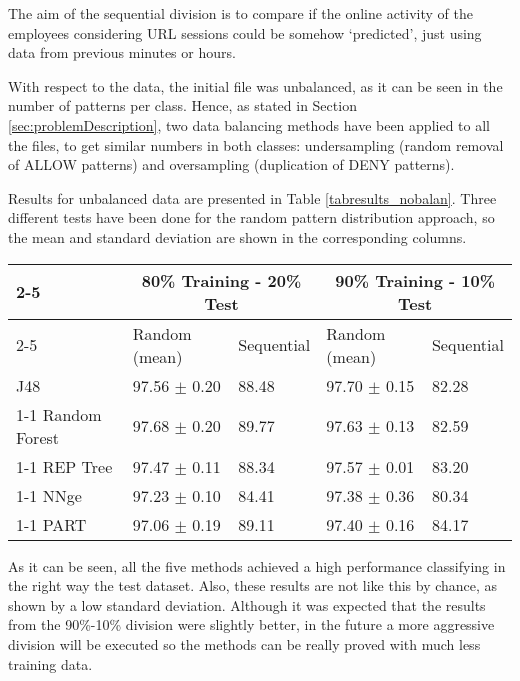 \documentclass{llncs}
\begin{document}
The aim of the sequential division is to compare if the online activity of the employees considering URL sessions could be somehow `predicted', just using data from previous minutes or hours.

With respect to the data, the initial file was unbalanced, as it can be seen in the number of patterns per class. Hence, as stated in Section \ref{sec:problemDescription}, two data balancing methods have been applied to all the files, to get similar numbers in both classes: undersampling (random removal of ALLOW patterns) and oversampling (duplication of DENY patterns).

Results for unbalanced data are presented in Table \ref{tabresults_nobalan}.
Three different tests have been done for the random pattern distribution approach, so the mean and standard deviation are shown in the corresponding columns.

\begin{table*}[htpb]
\centering
 \caption{\label{tabresults_nobalan} Percentage of correctly classified patterns for unbalanced data}
{\small
\begin{tabular}{|l|l|l|l|l|}
\cline{2-5}
\multicolumn{1}{l|}{} & \multicolumn{2}{c|}{80\% Training - 20\% Test} & \multicolumn{2}{c|}{90\% Training - 10\% Test} \\ 
\cline{2-5}
\multicolumn{1}{l|}{} & Random (mean) & Sequential & Random (mean) & Sequential \\ 
\hline
J48 & 97.56 $\pm$ 0.20 & 88.48 & 97.70 $\pm$ 0.15 & 82.28 \\ 
\cline{1-1}
Random Forest & 97.68 $\pm$ 0.20 & 89.77 & 97.63 $\pm$ 0.13 & 82.59 \\ 
\cline{1-1}
REP Tree & 97.47 $\pm$ 0.11 & 88.34 & 97.57 $\pm$ 0.01 & 83.20 \\ 
\cline{1-1}
NNge & 97.23 $\pm$ 0.10 & 84.41 & 97.38 $\pm$ 0.36 & 80.34 \\ 
\cline{1-1}
PART & 97.06 $\pm$ 0.19 & 89.11 & 97.40 $\pm$ 0.16 & 84.17 \\ 
\hline
\end{tabular}
}
\end{table*}
 
As it can be seen, all the five methods achieved a high performance classifying in the right way the test dataset. Also, these results are not like this by chance, as shown by a low standard deviation. Although it was expected that the results from the 90\%-10\% division were slightly better, in the future a more aggressive division will be executed so the methods can be really proved with much less training data.
\end{document}
